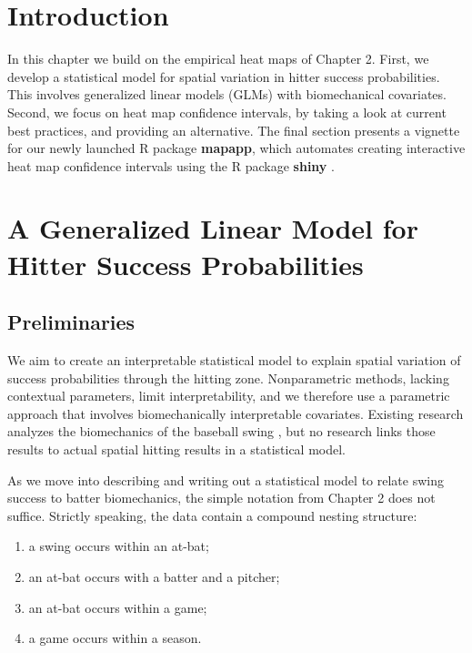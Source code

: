 \section{Introduction}
In this chapter we build on the empirical heat maps of Chapter 2. First, we develop a statistical model for spatial variation in hitter success probabilities. This involves generalized linear models (GLMs) with biomechanical covariates. Second, we focus on heat map confidence intervals, by taking a look at current best practices, and providing an alternative. The final section presents a vignette for our newly launched R package {\bf mapapp}, which automates creating interactive heat map confidence intervals using the R package {\bf shiny} \citep{Shiny}.

\section{A Generalized Linear Model for Hitter Success Probabilities} %

\subsection{Preliminaries}

We aim to create an interpretable statistical model to explain spatial variation of success probabilities through the hitting zone. Nonparametric methods, lacking contextual parameters, limit interpretability, and we therefore use a parametric approach that involves biomechanically interpretable covariates. Existing research analyzes the biomechanics of the baseball swing \citep{Welch1995}, but no research links those results to actual spatial hitting results in a statistical model. 

As we move into describing and writing out a statistical model to relate swing success to batter biomechanics, the simple notation from Chapter 2 does not suffice. Strictly speaking, the data contain a compound nesting structure:

\begin{enumerate}

\item a swing occurs within an at-bat;

\item an at-bat occurs with a batter and a pitcher;

\item an at-bat occurs within a game;

\item a game occurs within a season.

\end{enumerate}

